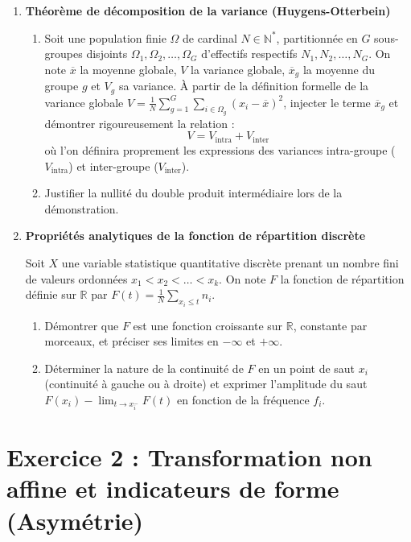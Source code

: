 \documentclass[11pt,a4paper]{article}
\begin{document}
\begin{enumerate}
    \item \textbf{Théorème de décomposition de la variance (Huygens-Otterbein)}
    \begin{enumerate}
        \item Soit une population finie $\Omega$ de cardinal $N \in \mathbb{N}^*$, partitionnée en $G$ sous-groupes disjoints $\Omega_1, \Omega_2, \dots, \Omega_G$ d'effectifs respectifs $N_1, N_2, \dots, N_G$. On note $\overline{x}$ la moyenne globale, $V$ la variance globale, $\overline{x}_g$ la moyenne du groupe $g$ et $V_g$ sa variance.
        À partir de la définition formelle de la variance globale $V = \frac{1}{N}\sum_{g=1}^G \sum_{i \in \Omega_g} (x_i - \overline{x})^2$, injecter le terme $\overline{x}_g$ et démontrer rigoureusement la relation :
        \[ V = V_{\text{intra}} + V_{\text{inter}} \]
        où l'on définira proprement les expressions des variances intra-groupe ($V_{\text{intra}}$) et inter-groupe ($V_{\text{inter}}$).
        \item Justifier la nullité du double produit intermédiaire lors de la démonstration.
    \end{enumerate}

    \item \textbf{Propriétés analytiques de la fonction de répartition discrète}
    
    Soit $X$ une variable statistique quantitative discrète prenant un nombre fini de valeurs ordonnées $x_1 < x_2 < \dots < x_k$. On note $F$ la fonction de répartition définie sur $\mathbb{R}$ par $F(t) = \frac{1}{N}\sum_{x_i \le t} n_i$.
    \begin{enumerate}
        \item Démontrer que $F$ est une fonction croissante sur $\mathbb{R}$, constante par morceaux, et préciser ses limites en $-\infty$ et $+\infty$.
        \item Déterminer la nature de la continuité de $F$ en un point de saut $x_i$ (continuité à gauche ou à droite) et exprimer l'amplitude du saut $F(x_i) - \lim_{t \to x_i^-} F(t)$ en fonction de la fréquence $f_i$.
    \end{enumerate}
\end{enumerate}

\newpage

\section*{Exercice 2 : Transformation non affine et indicateurs de forme (Asymétrie)}
\end{document}
